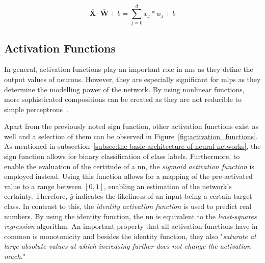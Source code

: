 \documentclass[draft,final]{vutinfth} %
\newcommand{\p}[1]{see p. #1}
\begin{document}
    \begin{equation}
        \bar{\boldsymbol{X}}\cdot\bar{\boldsymbol{W}} + b=\sum_{j=0}^{d}x_j*w_j + b\label{eq:linear_function_equation}
    \end{equation}

    \subsection{Activation Functions}
    In general, activation functions play an important role in \glspl{nn} as they define the output values of neurons.
    However, they are especially significant for \glspl{mlp} as they determine the modelling power of the network.
    By using nonlinear functions, more sophisticated compositions can be created as they are not reducible to simple perceptrons~\citep[\p{13}]{aggarwal_neural_2018}.

    Apart from the previously noted sign function, other activation functions exist as well and a selection of them can be observed in Figure~\ref{fig:activation_functions}.
    As mentioned in subsection~\ref{subsec:the-basic-architecture-of-neural-networks}, the sign function allows for binary classification of class labels.
    Furthermore, to enable the evaluation of the certitude of a \gls{nn}, the \textit{sigmoid activation function} is employed instead.
    Using this function allows for a mapping of the pre-activated value to a range between $[0,1]$, enabling an estimation of the network's certainty.
    Therefore, $\hat{y}$ indicates the likeliness of an input being a certain target class.
    In contrast to this, the \textit{identity activation function} is used to predict real numbers.
    By using the identity function, the \gls{nn} is equivalent to the \textit{least-squares regression} algorithm.
    An important property that all activation functions have in common is monotonicity and besides the identity function, they also "\textit{saturate at large absolute values at which increasing further does not change the activation much.}"\citep[\p{13}]{aggarwal_neural_2018}
\end{document}
